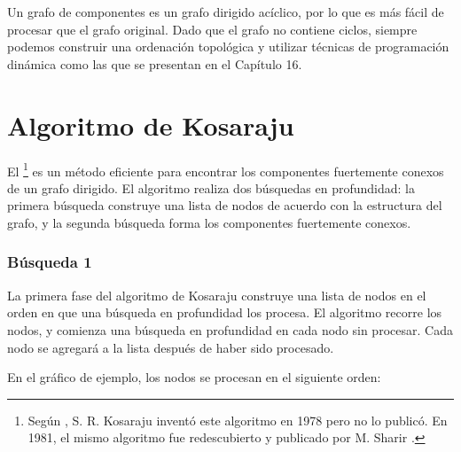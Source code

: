 Un grafo de componentes es un grafo dirigido acíclico,
por lo que es más fácil de procesar que el grafo original.
Dado que el grafo no contiene ciclos,
siempre podemos construir una ordenación topológica y
utilizar técnicas de programación dinámica como las
que se presentan en el Capítulo 16.

\section{Algoritmo de Kosaraju}


El \footnote{Según \cite{aho83},
S. R. Kosaraju inventó este algoritmo en 1978
pero no lo publicó. En 1981, el mismo algoritmo fue redescubierto
y publicado por M. Sharir \cite{sha81}.} es un método eficiente
para encontrar los componentes fuertemente conexos
de un grafo dirigido.
El algoritmo realiza dos búsquedas en profundidad:
la primera búsqueda construye una lista de nodos
de acuerdo con la estructura del grafo,
y la segunda búsqueda forma los componentes fuertemente conexos.

\subsubsection{Búsqueda 1}
La primera fase del algoritmo de Kosaraju construye
una lista de nodos en el orden en que una
búsqueda en profundidad los procesa.
El algoritmo recorre los nodos,
y comienza una búsqueda en profundidad en cada
nodo sin procesar.
Cada nodo se agregará a la lista
después de haber sido procesado.

En el gráfico de ejemplo, los nodos se procesan
en el siguiente orden:
\begin{center}
\end{center}

